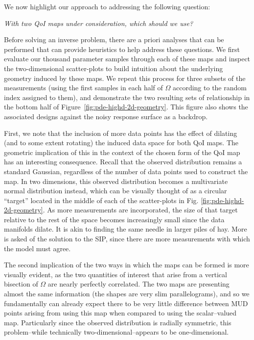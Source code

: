 We now highlight our approach to addressing the following question:

\begin{centering}
\emph{With two QoI maps under consideration, which should we use?}
\end{centering}

Before solving an inverse problem, there are a priori analyses that can be performed that can provide heuristics to help address these questions.
We first evaluate our thousand parameter samples through each of these maps and inspect the two-dimensional scatter-plots to build intuition about the underlying geometry induced by these maps.
We repeat this process for three subsets of the measurements (using the first samples in each half of $\Omega$ according to the random index assigned to them), and demonstrate the two resulting sets of relationship in the bottom half of Figure~\ref{fig:pde-highd-2d-geometry}.
This figure also shows the associated designs against the noisy response surface as a backdrop.

First, we note that the inclusion of more data points has the effect of dilating (and to some extent rotating) the induced data space for both QoI maps.
The geometric implication of this in the context of the chosen form of the QoI map has an interesting consequence.
Recall that the observed distribution remains a standard Gaussian, regardless of the number of data points used to construct the map.
In two dimensions, this observed distribution becomes a multivariate normal distribution instead, which can be visually thought of as a circular ``target'' located in the middle of each of the scatter-plots in Fig. \ref{fig:pde-highd-2d-geometry}.
As more measurements are incorporated, the size of that target relative to the rest of the space becomes increasingly small since the data manifolds dilate.
It is akin to finding the same needle in larger piles of hay.
More is asked of the solution to the SIP, since there are more measurements with which the model must agree.

The second implication of the two ways in which the maps can be formed is more visually evident, as the two quantities of interest that arise from a vertical bisection of $\Omega$ are nearly perfectly correlated.
The two maps are presenting almost the same information (the shapes are very slim parallelograms), and so we fundamentally can already expect there to be very little difference between MUD points arising from using this map when compared to using the scalar--valued map.
Particularly since the observed distribution is radially symmetric, this problem\---while technically two-dimensional\---appears to be one-dimensional.

